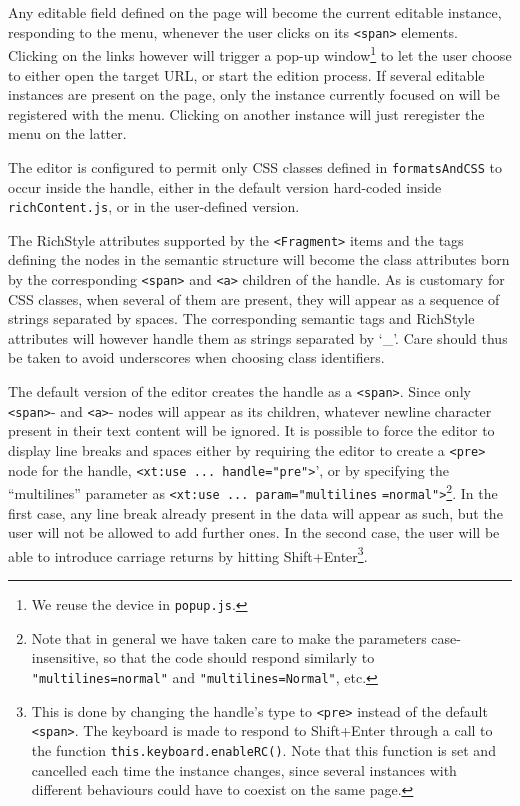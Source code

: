 \documentclass[11pt,a4paper]{article}
\begin{document}

Any editable field defined on the page will become the current editable instance, responding to the menu, whenever the user clicks on its \texttt{<span>} elements. Clicking on the links however will trigger a pop-up window\footnote{We reuse the device in \texttt{popup.js}.} to let the user choose to either open the target URL, or start the edition process. If several editable instances are present on the page, only the instance currently focused on will be registered with the menu. Clicking on another instance will just reregister the menu on the latter.


The editor is configured to permit only CSS classes defined in \texttt{formatsAndCSS} to occur inside the handle, either in the default version hard-coded inside \texttt{richContent.js}, or in the user-defined version.
 

The RichStyle attributes supported by the \texttt{<Fragment>} items and the tags defining the nodes in the semantic structure will become the class attributes born by the corresponding \texttt{<span>} and \texttt{<a>} children of the handle. As is customary for CSS classes, when several of them are present, they will appear as a sequence of strings separated by spaces. The corresponding semantic tags and RichStyle attributes will however handle them as strings separated by `\_'. Care should thus be taken to avoid underscores when choosing class identifiers. 


The default version of the editor creates the handle as a \texttt{<span>}. Since only \texttt{<span>}- and \texttt{<a>}- nodes will appear as its children, whatever newline character present in their text content will be ignored. It is possible to force the editor to display line breaks and spaces either by requiring the editor to create a \texttt{<pre>} node for the handle, \verb?<xt:use ... handle="pre">?', or by specifying the ``multilines'' parameter as \verb?<xt:use ... param="multilines? \verb?=normal">?\footnote{Note that in general we have taken care to make the parameters case-insensitive, so that the code should respond similarly to \texttt{"multilines=normal"} and \texttt{"multilines=Normal"}, etc.}. In the first case, any line break already present in the data will appear as such, but the user will not be allowed to add further ones. In the second case, the user will be able to introduce carriage returns by hitting Shift+Enter\footnote{This is done by changing the handle's type to \texttt{<pre>} instead of the default \texttt{<span>}. The keyboard is made to respond to Shift+Enter through a call to the function \texttt{this.keyboard.enableRC()}. Note that this function is set and cancelled each time the instance changes, since several instances with different behaviours could have to coexist on the same page.}.  
\end{document}
